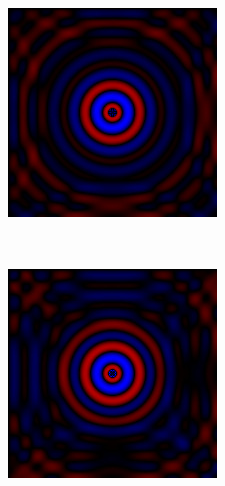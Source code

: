 \begin{figure}[p]
\begin{subfigure}[b]{0.3\textwidth}
        \label{fieldFig:4th}
    \end{subfigure}
    ~ %
    \begin{subfigure}[b]{0.3\textwidth}
        \includegraphics[width=\textwidth]{include/graphics/image10}
  
        \label{fieldFig:5th}
    \end{subfigure}
    ~ %
    \begin{subfigure}[b]{0.3\textwidth}
        \includegraphics[width=\textwidth]{include/graphics/image11}


\end{subfigure}
\end{figure}
